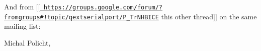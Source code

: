 \begin{DoxyCode}{0}
\end{DoxyCode}


And from \mbox{[}\mbox{[}\href{https://groups.google.com/forum/?fromgroups\#!topic/qextserialport/P_5TrNHBICE}{\texttt{ https\+://groups.\+google.\+com/forum/?fromgroups\#!topic/qextserialport/\+P\+\_\+Tr\+N\+H\+B\+I\+CE}} this other thread\mbox{]}\mbox{]} on the same mailing list\+:


\begin{DoxyItemize}
\item Michal Policht,
\end{DoxyItemize}


\begin{DoxyCode}{0}
\end{DoxyCode}
 